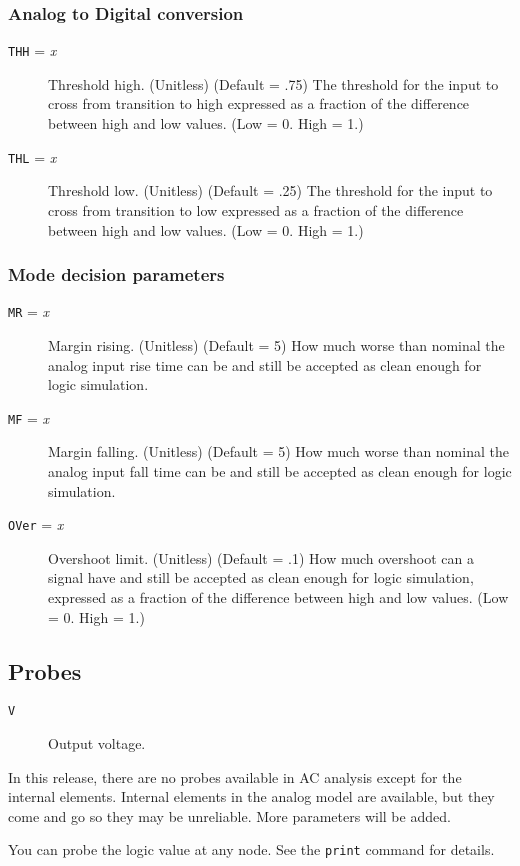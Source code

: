 \subsubsection{Analog to Digital conversion}
\begin{description}

\item[{\tt THH} = {\it x}] Threshold high.  (Unitless) (Default = .75) The
threshold for the input to cross from transition to high expressed as a
fraction of the difference between high and low values.  (Low = 0.  High =
1.)

\item[{\tt THL} = {\it x}] Threshold low.  (Unitless) (Default = .25) The
threshold for the input to cross from transition to low expressed as a
fraction of the difference between high and low values.  (Low = 0.  High =
1.)

\end{description}
\subsubsection{Mode decision parameters}
\begin{description}

\item[{\tt MR} = {\it x}] Margin rising.  (Unitless) (Default = 5) How much
worse than nominal the analog input rise time can be and still be accepted
as clean enough for logic simulation.

\item[{\tt MF} = {\it x}] Margin falling.  (Unitless) (Default = 5) How much
worse than nominal the analog input fall time can be and still be accepted
as clean enough for logic simulation.

\item[{\tt OVer} = {\it x}] Overshoot limit.  (Unitless) (Default = .1) How
much overshoot can a signal have and still be accepted as clean enough for
logic simulation, expressed as a fraction of the difference between high and
low values.  (Low = 0.  High = 1.)

\end{description}
\subsection{Probes}

\begin{description}

\item[{\tt V}] Output voltage.

\end{description}

In this release, there are no probes available in AC analysis except for the
internal elements.  Internal elements in the analog model are available, but
they come and go so they may be unreliable.  More parameters will be added.

You can probe the logic value at any node.  See the {\tt print} command for
details.
